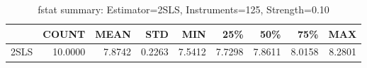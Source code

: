 \begin{table}[ht]
\centering
\caption{fstat summary: Estimator=2SLS, Instruments=125, Strength=0.10}
\begin{tabular}{lrrrrrrrr}
\toprule
 & COUNT & MEAN & STD & MIN & 25\% & 50\% & 75\% & MAX \\
\midrule
2SLS & 10.0000 & 7.8742 & 0.2263 & 7.5412 & 7.7298 & 7.8611 & 8.0158 & 8.2801 \\
\bottomrule
\end{tabular}
\end{table}

